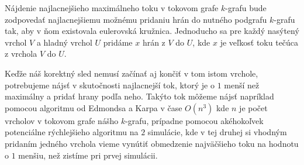 Nájdenie najlacnejšieho maximálneho toku v tokovom grafe $k$-grafu bude zodpovedať
najlacnejšiemu možnému pridaniu hrán do nutného podgrafu $k$-grafu tak, aby v ňom existovala eulerovská
kružnica. Jednoducho sa pre každý nasýtený vrchol $V$ a hladný vrchol $U$ pridáme $x$ hrán z $V$ do $U$,
kde $x$ je veľkosť toku tečúca z vrchola $V$ do $U$.

Keďže náš korektný sled nemusí začínať aj končiť v tom istom vrchole, potrebujeme
nájsť v skutočnosti najlacnejší tok, ktorý je o $1$ menší než maximálny a pridať hrany podľa neho.
Takýto tok môžeme nájsť napríklad pomocou algoritmu od Edmondsa a Karpa \cite{mincost_maxflow} v
čase $O(n^3)$ kde $n$ je počet vrcholov v tokovom grafe nášho $k$-grafu, prípadne pomocou akéhokoľvek potenciálne rýchlejšieho
algoritmu na $2$ simulácie, kde v tej druhej si vhodným pridaním jedného vrchola vieme vynútiť
obmedzenie najväčšieho toku na hodnotu o $1$ menšiu, než zistíme pri prvej simulácii.
